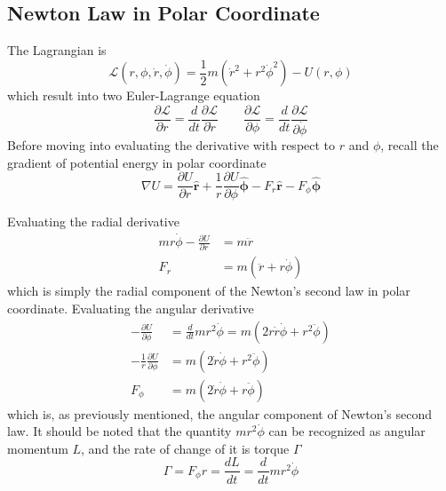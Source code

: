 \documentclass[../../../main.tex]{subfiles}
\begin{document}
\subsection*{Newton Law in Polar Coordinate}
The Lagrangian is
\begin{equation*}
	\mathcal{L}(r,\phi,\dot{r},\dot{\phi})=\frac{1}{2}m(\dot{r}^2+r^2\dot{\phi}^2)-U(r,\phi)
\end{equation*}
which result into two Euler-Lagrange equation
\begin{equation*}
	\frac{\partial\mathcal{L}}{\partial r}=\frac{d}{dt}\frac{\partial\mathcal{L}}{\partial \dot{r}}\qquad\frac{\partial\mathcal{L}}{\partial \phi}=\frac{d}{dt}\frac{\partial\mathcal{L}}{\partial \dot{\phi}}
\end{equation*}
Before moving into evaluating the derivative with respect to $r$ and $\phi$, recall the gradient of potential energy in polar coordinate
\begin{equation*}
	\nabla U=\frac{\partial U}{\partial r}\mathbf{\hat{{r}}}+ \frac{1}{r}\frac{\partial U}{\partial \phi}\boldsymbol{\hat{\phi}}-F_r\mathbf{\hat{r}}-F_{\phi}\boldsymbol{\hat{\phi}}
\end{equation*}

Evaluating the radial derivative
\begin{align*}
	mr\dot{\phi}-\frac{\partial U}{\partial r} & =m\ddot{r}               \\
	F_r                                        & =m(\ddot{r}+r\dot{\phi})
\end{align*}
which is simply the radial component of the Newton's second law in polar coordinate.
Evaluating the angular derivative
\begin{align*}
	-\frac{\partial U}{\partial \phi}            & =\frac{d}{dt}mr^2\dot{\phi}=m(2r\dot{r}\dot{\phi}+r^2\ddot{\phi}) \\
	-\frac{1}{r}\frac{\partial U}{\partial \phi} & =m(2\dot{r}\dot{\phi}+r^2\ddot{\phi})                             \\
	F_\phi                                       & =m(2\dot{r}\dot{\phi}+r\ddot{\phi})
\end{align*}
which is, as previously mentioned, the angular component of Newton's second law. It should be noted that the quantity $mr^2\dot{\phi}$ can be recognized as angular momentum $L$, and the rate of change of it is torque $\Gamma$
\begin{equation*}
	\Gamma=F_\phi r=\frac{dL}{dt}=\frac{d}{dt}mr^2\dot{\phi}
\end{equation*}
\end{document}
